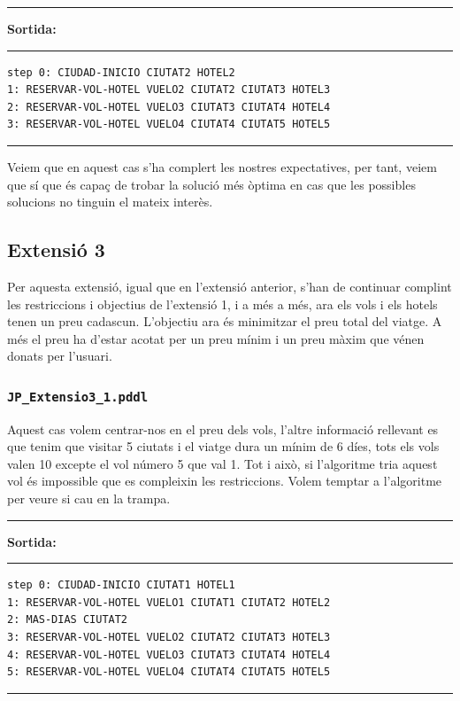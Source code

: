 \documentclass[11pt,a4paper]{article}
\begin{document}
\begin{samepage}
\medskip
\noindent
\rule{0.1\textwidth}{0.5mm}
\textbf{Sortida:}
\rule{0.76\textwidth}{0.5mm}
\begin{verbatim}
step 0: CIUDAD-INICIO CIUTAT2 HOTEL2
1: RESERVAR-VOL-HOTEL VUELO2 CIUTAT2 CIUTAT3 HOTEL3
2: RESERVAR-VOL-HOTEL VUELO3 CIUTAT3 CIUTAT4 HOTEL4
3: RESERVAR-VOL-HOTEL VUELO4 CIUTAT4 CIUTAT5 HOTEL5
\end{verbatim}
\rule{\textwidth}{0.5mm}
\medskip
\end{samepage}

Veiem que en aquest cas s'ha complert les nostres expectatives, per tant, veiem que sí que és capaç de trobar la solució més òptima en cas que les possibles solucions no tinguin el mateix interès.


\subsection{Extensió 3}

Per aquesta extensió, igual que en l'extensió anterior, s'han de continuar complint les restriccions i objectius de l'extensió 1, i a més a més, ara els vols i els hotels tenen un preu cadascun.
L'objectiu ara és minimitzar el preu total del viatge. A més el preu ha d'estar acotat per un preu mínim i un preu màxim que vénen donats per l'usuari.

\subsubsection*{\texttt{JP\_Extensio3\_1.pddl}}

Aquest cas volem centrar-nos en el preu dels vols, l'altre informació rellevant es que tenim que visitar 5 ciutats i el viatge dura un mínim de 6 díes, tots els vols valen 10 excepte el vol número 5 que val 1. Tot i això, si l'algoritme tria aquest vol és impossible que es compleixin les restriccions. Volem temptar a l'algoritme per veure si cau en la trampa.

\begin{samepage}
\medskip
\noindent
\rule{0.1\textwidth}{0.5mm}
\textbf{Sortida:}
\rule{0.76\textwidth}{0.5mm}
\begin{verbatim}
step 0: CIUDAD-INICIO CIUTAT1 HOTEL1
1: RESERVAR-VOL-HOTEL VUELO1 CIUTAT1 CIUTAT2 HOTEL2
2: MAS-DIAS CIUTAT2
3: RESERVAR-VOL-HOTEL VUELO2 CIUTAT2 CIUTAT3 HOTEL3
4: RESERVAR-VOL-HOTEL VUELO3 CIUTAT3 CIUTAT4 HOTEL4
5: RESERVAR-VOL-HOTEL VUELO4 CIUTAT4 CIUTAT5 HOTEL5
\end{verbatim}
\rule{\textwidth}{0.5mm}
\medskip
\end{samepage}
\end{document}
